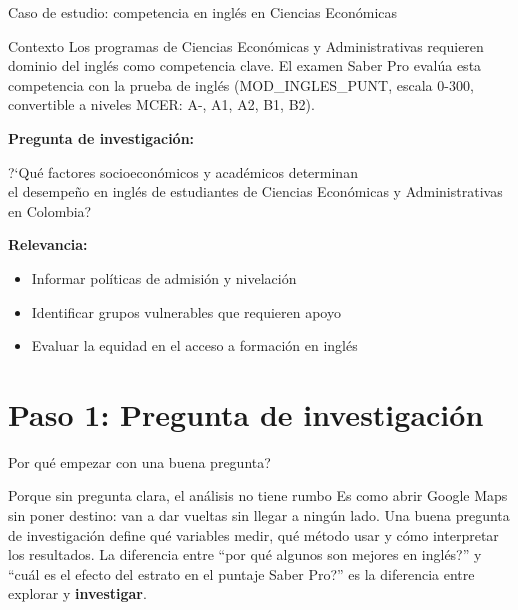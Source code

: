 \documentclass[aspectratio=169, 11pt]{beamer}
\begin{document}
\begin{frame}{Caso de estudio: competencia en inglés en Ciencias Econ\'omicas}
\begin{block}{Contexto}
Los programas de Ciencias Econ\'omicas y Administrativas requieren dominio del inglés como competencia clave. El examen Saber Pro evalúa esta competencia con la prueba de inglés (MOD\_INGLES\_PUNT, escala 0-300, convertible a niveles MCER: A-, A1, A2, B1, B2).
\end{block}

\vspace{0.2cm}
\textbf{Pregunta de investigaci\'on:}
\begin{center}
\large
\textcolor{javeriana}{?`Qu\'e factores socioecon\'omicos y acad\'emicos determinan\\el desempe\~no en ingl\'es de estudiantes de Ciencias Econ\'omicas y Administrativas\\en Colombia?}
\end{center}

\vspace{0.2cm}
\textbf{Relevancia:}
\begin{itemize}
\item Informar pol\'iticas de admisi\'on y nivelaci\'on
\item Identificar grupos vulnerables que requieren apoyo
\item Evaluar la equidad en el acceso a formaci\'on en ingl\'es
\end{itemize}
\end{frame}

\section{Paso 1: Pregunta de investigaci\'on}

\begin{frame}{\textquestiondown{}Por qu\'e empezar con una buena pregunta?}
\begin{exampleblock}{Porque sin pregunta clara, el an\'alisis no tiene rumbo}
\small
Es como abrir Google Maps sin poner destino: van a dar vueltas sin llegar a ning\'un lado. Una buena pregunta de investigaci\'on define qu\'e variables medir, qu\'e m\'etodo usar y c\'omo interpretar los resultados. La diferencia entre ``\textquestiondown{}por qu\'e algunos son mejores en ingl\'es?'' y ``\textquestiondown{}cu\'al es el efecto del estrato en el puntaje Saber Pro?'' es la diferencia entre explorar y \textbf{investigar}.
\end{exampleblock}
\end{frame}
\end{document}
